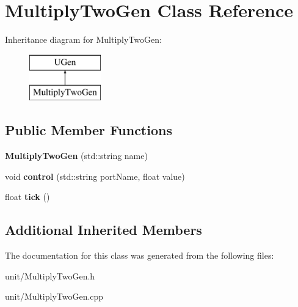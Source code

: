 \hypertarget{classMultiplyTwoGen}{}\section{Multiply\+Two\+Gen Class Reference}
\label{classMultiplyTwoGen}
Inheritance diagram for Multiply\+Two\+Gen\+:\begin{figure}[H]
\begin{center}
\leavevmode
\includegraphics[height=2.000000cm]{classMultiplyTwoGen}
\end{center}
\end{figure}
\subsection*{Public Member Functions}
\begin{DoxyCompactItemize}
\item 
{\bfseries Multiply\+Two\+Gen} (std\+::string name)\hypertarget{classMultiplyTwoGen_a35e526170e8ac7a43fc19c2a78e14b44}{}\label{classMultiplyTwoGen_a35e526170e8ac7a43fc19c2a78e14b44}

\item 
void {\bfseries control} (std\+::string port\+Name, float value)\hypertarget{classMultiplyTwoGen_af8558651a63c73f27221e99ad03f3242}{}\label{classMultiplyTwoGen_af8558651a63c73f27221e99ad03f3242}

\item 
float {\bfseries tick} ()\hypertarget{classMultiplyTwoGen_a70a07ad9e0f67e6a50aadcdf902db8f3}{}\label{classMultiplyTwoGen_a70a07ad9e0f67e6a50aadcdf902db8f3}

\end{DoxyCompactItemize}
\subsection*{Additional Inherited Members}


The documentation for this class was generated from the following files\+:\begin{DoxyCompactItemize}
\item 
unit/Multiply\+Two\+Gen.\+h\item 
unit/Multiply\+Two\+Gen.\+cpp\end{DoxyCompactItemize}
